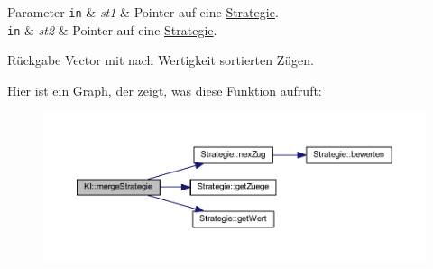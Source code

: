 \begin{DoxyItemize}
\begin{DoxyParams}[1]{Parameter}
\mbox{\tt in}  & {\em st1} & Pointer auf eine \hyperlink{class_strategie}{Strategie}. \\
\hline
\mbox{\tt in}  & {\em st2} & Pointer auf eine \hyperlink{class_strategie}{Strategie}. \\
\hline
\end{DoxyParams}
\begin{DoxyReturn}{Rückgabe}
Vector mit nach Wertigkeit sortierten Zügen. 
\end{DoxyReturn}

\end{DoxyItemize}

Hier ist ein Graph, der zeigt, was diese Funktion aufruft\+:\nopagebreak
\begin{figure}[H]
\begin{center}
\leavevmode
\includegraphics[width=350pt]{class_k_i_ae97a6dd7ab3de2a934ca5c28c4cc63b3_cgraph}
\end{center}
\end{figure}


\hypertarget{class_k_i_a840820c024ad7069c2064fc30f964169}{}
